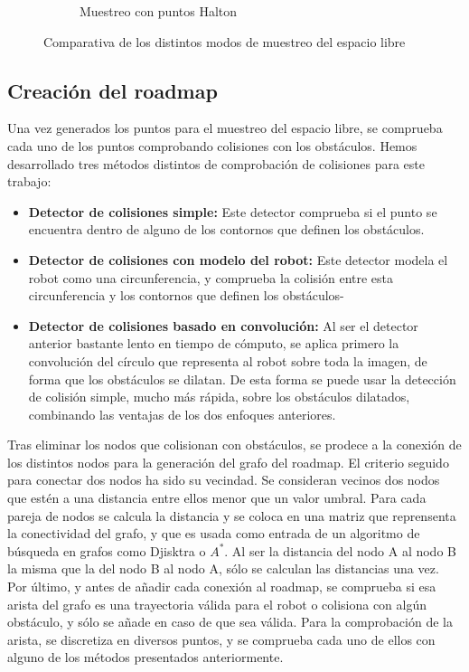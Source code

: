 \begin{figure}[b]
\begin{subfigure}[b]{0.3\textwidth}
                \caption{Muestreo con puntos Halton}
                \label{fig:muestreo_halton}
        \end{subfigure}
        \caption{Comparativa de los distintos modos de muestreo del espacio libre}\label{fig:muestreo}
\end{figure}

\subsection{Creación del roadmap}
Una vez generados los puntos para el muestreo del espacio libre, se comprueba cada uno de los puntos comprobando colisiones con los obstáculos. Hemos desarrollado tres métodos distintos de comprobación de colisiones para este trabajo:

\begin{itemize}
\item \textbf{Detector de colisiones simple: } Este detector comprueba si el punto se encuentra dentro de alguno de los contornos que definen los obstáculos.
\item \textbf{Detector de colisiones con modelo del robot: } Este detector modela el robot como una circunferencia, y comprueba la colisión entre esta circunferencia y los contornos que definen los obstáculos-
\item \textbf{Detector de colisiones basado en convolución: } Al ser el detector anterior bastante lento en tiempo de cómputo, se aplica primero la convolución del círculo que representa al robot sobre toda la imagen, de forma que los obstáculos se dilatan. De esta forma se puede usar la detección de colisión simple, mucho más rápida, sobre los obstáculos dilatados, combinando las ventajas de los dos enfoques anteriores.
\end{itemize}

Tras eliminar los nodos que colisionan con obstáculos, se prodece a la conexión de los distintos nodos para la generación del grafo del roadmap. El criterio seguido para conectar dos nodos ha sido su vecindad. Se consideran vecinos dos nodos que estén a una distancia entre ellos menor que un valor umbral. Para cada pareja de nodos se calcula la distancia y se coloca en una matriz que reprensenta la conectividad del grafo, y que es usada como entrada de un algoritmo de búsqueda en grafos como Djisktra o $A^*$. Al ser la distancia del nodo A al nodo B la misma que la del nodo B al nodo A, sólo se calculan las distancias una vez.\\

Por último, y antes de añadir cada conexión al roadmap, se comprueba si esa arista del grafo es una trayectoria válida para el robot o colisiona con algún obstáculo, y sólo se añade en caso de que sea válida. Para la comprobación de la arista, se discretiza en diversos puntos, y se comprueba cada uno de ellos con alguno de los métodos presentados anteriormente.\\
